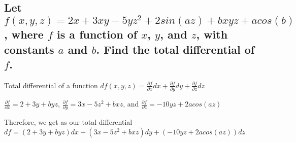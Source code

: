 \documentclass{article}
\begin{document}
\subsection{Let $f(x,y,z) = 2x + 3xy - 5yz^{2} + 2 sin(az) + bxyz + a cos(b)$, where $f$ is a function of $x$, $y$, and $z$, with constants $a$ and $b$. Find the total differential of $f$.}
\par\noindent\Large Total differential of a function $df(x, y, z) = \frac{\partial f}{\partial x}dx + \frac{\partial f}{\partial y}dy + \frac{\partial f}{\partial z}dz$
\par\noindent\Large $\frac{\partial f}{\partial x} = 2 + 3y + byz$, $\frac{\partial f}{\partial y} = 3x - 5z^{2} + bxz$, and $\frac{\partial f}{\partial z} = -10yz + 2acos(az)$
\par\noindent\large Therefore, we get as our total differential $df =  (2 + 3y + byz)dx + (3x - 5z^{2} + bxz)dy + (-10yz + 2acos(az))dz$
\end{document}

